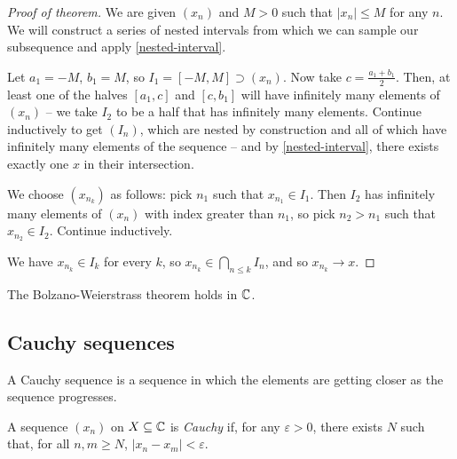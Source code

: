 \documentclass{../template/note}
\begin{document}
    \begin{proof}[Proof of theorem]
        We are given \((x_n)\) and \(M > 0\) such that \(|x_n| \leq M\) for any \(n\). We will construct a series of nested intervals from which we can sample our subsequence and apply \cref{nested-interval}.

        Let \(a_1 = -M\), \(b_1 = M\), so \(I_1 = [-M, M] \supset (x_n)\). Now take \(c = \frac{a_1+b_1}{2}\). Then, at least one of the halves \([a_1, c]\) and \([c, b_1]\) will have infinitely many elements of \((x_n)\) -- we take \(I_2\) to be a half that has infinitely many elements. Continue inductively to get \((I_n)\), which are nested by construction and all of which have infinitely many elements of the sequence -- and by \cref{nested-interval}, there exists exactly one \(x\) in their intersection.
        
        We choose \((x_{n_k})\) as follows: pick \(n_1\) such that \(x_{n_1} \in I_1\). Then \(I_2\) has infinitely many elements of \((x_n)\) with index greater than \(n_1\), so pick \(n_2 > n_1\) such that \(x_{n_2} \in I_2\). Continue inductively.

        We have \(x_{n_k} \in I_k\) for every \(k\), so \(x_{n_k} \in \bigcap_{n \leq k} I_n\), and so \(x_{n_k} \to x\).
    \end{proof}

    \begin{corollary}
        The Bolzano-Weierstrass theorem holds in \(\mathbb C\).
    \end{corollary}
    
    
    
    \subsection{Cauchy sequences}

    A Cauchy sequence is a sequence in which the elements are getting closer as the sequence progresses.

    \begin{definition}
        A sequence \((x_n)\) on \(X \subseteq \mathbb C\) is \emph{Cauchy} if, for any \(\varepsilon > 0\), there exists \(N\) such that, for all \(n, m \geq N\), \(|x_n - x_m| < \varepsilon\).
    \end{definition}
    
\end{document}
